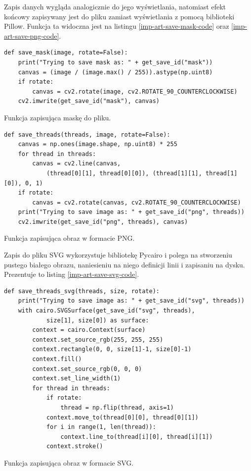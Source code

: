 \documentclass[a4paper, 12pt, polish, twoside]{extreport}
\begin{document}
        \newpage
        Zapis danych wygląda analogicznie do jego wyświetlania, natomiast efekt końcowy zapisywany jest do pliku zamiast wyświetlania z pomocą biblioteki Pillow. Funkcja ta widoczna jest na listingu \ref{imp-art-save-mask-code} oraz \ref{imp-art-save-png-code}.
        \begin{code}[H]
        \begin{verbatim}
def save_mask(image, rotate=False):
    print("Trying to save mask as: " + get_save_id("mask"))
    canvas = (image / (image.max() / 255)).astype(np.uint8)
    if rotate:
        canvas = cv2.rotate(image, cv2.ROTATE_90_COUNTERCLOCKWISE)
    cv2.imwrite(get_save_id("mask"), canvas)
        \end{verbatim}
        \caption{Funkcja zapisująca maskę do pliku.}
        \label{imp-art-save-mask-code}
        \end{code}
        
        \begin{code}[H]
        \begin{verbatim}
def save_threads(threads, image, rotate=False):
    canvas = np.ones(image.shape, np.uint8) * 255
    for thread in threads:
        canvas = cv2.line(canvas, 
            (thread[0][1], thread[0][0]), (thread[1][1], thread[1][0]), 0, 1)
    if rotate:
        canvas = cv2.rotate(canvas, cv2.ROTATE_90_COUNTERCLOCKWISE)
    print("Trying to save image as: " + get_save_id("png", threads))
    cv2.imwrite(get_save_id("png", threads), canvas)
        \end{verbatim}
        \caption{Funkcja zapisująca obraz w formacie PNG.}
        \label{imp-art-save-png-code}
        \end{code}

        Zapis do pliku SVG wykorzystuje bibliotekę Pycairo i polega na stworzeniu pustego białego obrazu, naniesieniu na niego definicji linii i zapisaniu na dysku. Prezentuje to listing \ref{imp-art-save-svg-code}.
        \begin{code}[H]
        \begin{verbatim}
def save_threads_svg(threads, size, rotate):
    print("Trying to save image as: " + get_save_id("svg", threads))
    with cairo.SVGSurface(get_save_id("svg", threads), 
            size[1], size[0]) as surface:
        context = cairo.Context(surface)
        context.set_source_rgb(255, 255, 255)
        context.rectangle(0, 0, size[1]-1, size[0]-1)
        context.fill()
        context.set_source_rgb(0, 0, 0)
        context.set_line_width(1)
        for thread in threads:
            if rotate:
                thread = np.flip(thread, axis=1)
            context.move_to(thread[0][0], thread[0][1])
            for i in range(1, len(thread)):
                context.line_to(thread[i][0], thread[i][1])
            context.stroke()
        \end{verbatim}
        \caption{Funkcja zapisująca obraz w formacie SVG.}
        \label{imp-art-save-svg-code}
        \end{code}
\end{document}
